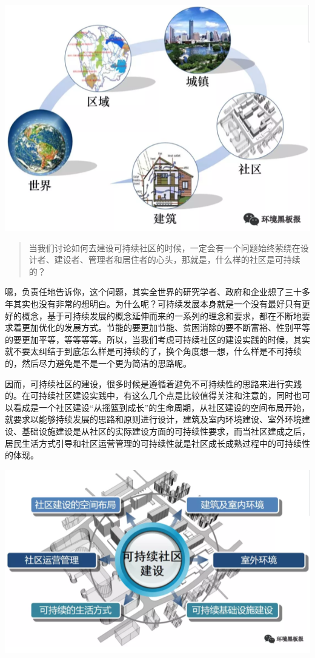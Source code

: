 \documentclass[]{book}
\begin{document}
\includegraphics[width=8.33in]{images/moma2}

\begin{quote}
当我们讨论如何去建设可持续社区的时候，一定会有一个问题始终萦绕在设计者、建设者、管理者和居住者的心头，那就是，什么样的社区是可持续的？
\end{quote}

嗯，负责任地告诉你，这个问题，其实全世界的研究学者、政府和企业想了三十多年其实也没有非常的想明白。为什么呢？可持续发展本身就是一个没有最好只有更好的概念，基于可持续发展的概念延伸而来的一系列的理念和要求，都在不断地要求着更加优化的发展方式。节能的要更加节能、贫困消除的要不断富裕、性别平等的要更加平等，等等等等。所以，当我们考虑可持续社区的建设实践的时候，其实就不要太纠结于到底怎么样是可持续的了，换个角度想一想，什么样是不可持续的，然后尽力避免是不是一个更为简洁的思路呢。

因而，可持续社区的建设，很多时候是遵循着避免不可持续性的思路来进行实践的。在可持续社区建设实践中，有这么几个点是比较值得关注和注意的，同时也可以看成是一个社区建设``从摇篮到成长''的生命周期，从社区建设的空间布局开始，就要求以能够持续发展的思路和原则进行设计，建筑及室内环境建设、室外环境建设、基础设施建设是从社区的实际建设方面的可持续性要求，而当社区建成之后，居民生活方式引导和社区运营管理的可持续性就是社区成长成熟过程中的可持续性的体现。

\includegraphics[width=8.33in]{images/moma3}
\end{document}
